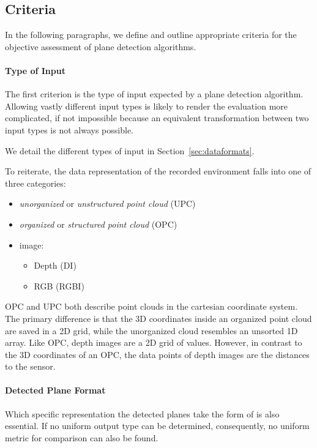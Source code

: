 \documentclass[main.tex]{subfiles}
\begin{document}
\subsection{Criteria}
In the following paragraphs, we define and outline appropriate criteria for the objective assessment of plane detection algorithms.

\paragraph{Type of Input}\label{par:input}
The first criterion is the type of input expected by a plane detection algorithm.
Allowing vastly different input types is likely to render the evaluation more complicated, if not impossible because an equivalent transformation
between two input types is not always possible. 

We detail the different types of input in Section~\ref{sec:dataformats}.

To reiterate, the data representation of the recorded environment falls into one of three categories:
\begin{itemize}
    \item \textit{unorganized} or \textit{unstructured point cloud} (UPC)
    \item \textit{organized} or \textit{structured point cloud} (OPC)
    \item image:
          \begin{itemize}
              \item Depth (DI)
              \item RGB (RGBI)
          \end{itemize}
\end{itemize}

OPC and UPC both describe point clouds in the cartesian coordinate system. The primary difference is that the 3D coordinates inside
an organized point cloud are saved in a 2D grid, while the unorganized cloud resembles an unsorted 1D array.
Like OPC, depth images are a 2D grid of values. However, in contrast to the 3D coordinates of an OPC, the data points of depth images
are the distances to the sensor.



\paragraph{Detected Plane Format} \label{subsec:planeformat}
Which specific representation the detected planes take the form of is also essential.
If no uniform output type can be determined, consequently, no uniform metric for comparison can also be found.
\end{document}
